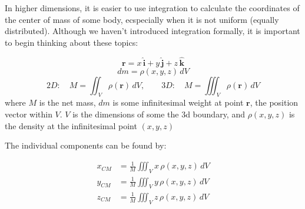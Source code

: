 In higher dimensions, it is easier to use integration to calculate the coordinates of the center of mass of some body, ecspecially when it is not uniform (equally distributed). Although we haven't introduced integration formally, it is important to begin thinking about these topics:
\begin{mdframed}[style=important, frametitle={2D and 3D Center of Mass}]
  $$\mathbf{r} = x\,\hat{\mathbf{i}} + y\,\hat{\mathbf{j}} + z\,\hat{\mathbf{k}}$$
  $$dm = \rho(x,y,z)\,dV$$
  $$2D: \quad M=\displaystyle\iint_{\;V} \rho(\mathbf r)\,dV, \qquad 3D: \quad M=\displaystyle\iiint_{\;V} \rho(\mathbf r)\,dV$$
  where $M$ is the net mass, $dm$ is some infinitesimal weight at point $\mathbf{r}$, the position vector within $V$. $V$ is the dimensions of some the 3d boundary, and $\rho(x,y,z)$ is the density at the infinitesimal point $(x,y,z)$

  The individual components can be found by:
\begin{center}
  \begin{align*}
      x_{CM}&=\frac{1}{M}\iiint_V x\,\rho(x,y,z)\,dV \\
        y_{CM}&=\frac{1}{M}\iiint_V y\,\rho(x,y,z)\,dV \\ 
        z_{CM}&=\frac{1}{M}\iiint_V z\,\rho(x,y,z)\,dV \\
  \end{align*}
\end{center}
\end{mdframed}
